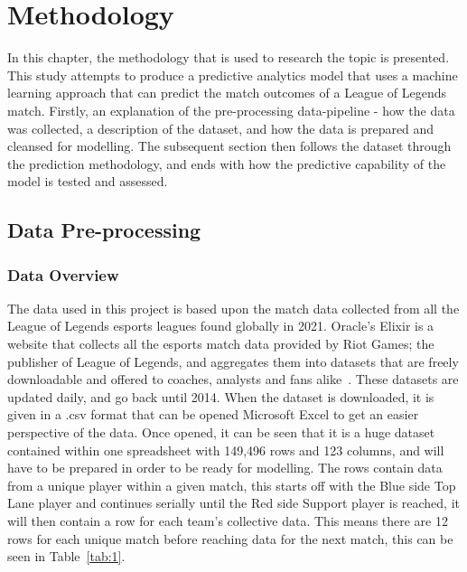 \chapter{Methodology}\label{ch:methodology}

In this chapter, the methodology that is used to research the topic is presented.
This study attempts to produce a predictive analytics model that uses a machine learning approach that can predict the match outcomes of a League of Legends match.
Firstly, an explanation of the pre-processing data-pipeline - how the data was collected, a description of the dataset, and how the data is prepared and cleansed for modelling.
The subsequent section then follows the dataset through the prediction methodology, and ends with how the predictive capability of the model is tested and assessed.

\section{Data Pre-processing}\label{sec:Data Pre-processing}
\subsection{Data Overview}\label{subsec:Data Overview}
The data used in this project is based upon the match data collected from all the League of Legends esports leagues found globally in 2021.
Oracle's Elixir is a website that collects all the esports match data provided by Riot Games;
the publisher of League of Legends, and aggregates them into datasets that are freely downloadable and offered to coaches, analysts and fans alike~\citep{oraclesElixir}.
These datasets are updated daily, and go back until 2014.
When the dataset is downloaded, it is given in a .csv format that can be opened Microsoft Excel to get an easier perspective of the data.
Once opened, it can be seen that it is a huge dataset contained within one spreadsheet with 149,496 rows and 123 columns, and will have to be prepared in order to be ready for  modelling.
The rows contain data from a unique player within a given match, this starts off with the Blue side Top Lane player and continues serially until the Red side Support player is reached, it will then contain a row for each team's collective data.
This means there are 12 rows for each unique match before reaching data for the next match, this can be seen in Table~\ref{tab:1}.

